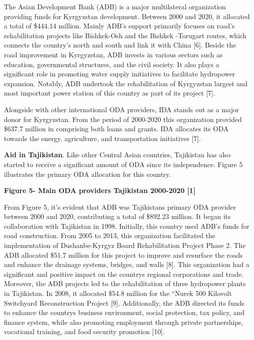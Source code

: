 The Asian Development Bank (ADB) is a major multilateral organization
providing funds for Kyrgyzstan development. Between 2000 and 2020, it
allocated a total of \$444.14 million. Mainly ADB's support primarily
focuses on road's rehabilitation projects like Bishkek-Osh and the
Bishkek -Torugart routes, which connects the country's north and south
and link it with China {[}6{]}. Beside the road improvement in
Kyrgyzstan, ADB invests in various sectors such as education,
governmental structures, and the civil society. It also plays a
significant role in promoting water supply initiatives to facilitate
hydropower expansion. Notably, ADB undertook the rehabilitation of
Kyrgyzstan largest and most important power station of this country as
part of its project {[}7{]}.

Alongside with other international ODA providers, IDA stands out as a
major donor for Kyrgyzstan. From the period of 2000-2020 this
organization provided \$637.7 million in comprising both loans and
grants. IDA allocates its ODA towards the energy, agriculture, and
transportation initiatives {[}7{]}.

{\bfseries Aid in Tajikistan}. Like other Central Asian countries,
Tajikistan has also started to receive a significant amount of ODA since
its independence. Figure 5 illustrates the primary ODA allocation for
this country.

{\bfseries Figure 5- Main ODA providers Tajikistan 2000-2020 {[}1{]}}

From Figure 5, it's evident that ADB was Tajikistan\textquotesingle s
primary ODA provider between 2000 and 2020, contributing a total of
\$892.23 million. It began its collaboration with Tajikistan in 1998.
Initially, this country used ADB's funds for road construction. From
2005 to 2013, this organization facilitated the implementation of
Dushanbe-Kyrgyz Board Rehabilitation Project Phase 2. The ADB allocated
\$51.7 million for this project to improve and resurface the roads and
enhance the drainage systems, bridges, and walls {[}8{]}. This
organization had a significant and positive impact on the
country\textquotesingle s regional corporations and trade. Moreover, the
ADB projects led to the rehabilitation of three hydropower plants in
Tajikistan. In 2008, it allocated \$54.8 million for the ``Nurek 500
Kilovolt Switchyard Reconstruction Project {[}9{]}. Additionally, the
ADB directed its funds to enhance the country\textquotesingle s business
environment, social protection, tax policy, and finance system, while
also promoting employment through private partnerships, vocational
training, and food security promotion {[}10{]}.

